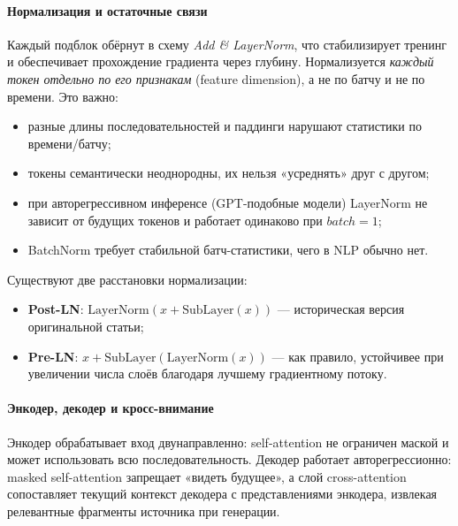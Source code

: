 \documentclass[12pt,a4paper]{article}
\begin{document}
\paragraph{Нормализация и остаточные связи}
Каждый подблок обёрнут в схему \textit{Add \& LayerNorm}, что стабилизирует тренинг и обеспечивает прохождение градиента через глубину. Нормализуется \emph{каждый токен отдельно по его признакам} (feature dimension), а не по батчу и не по времени. Это важно:
\begin{itemize}
  \item разные длины последовательностей и паддинги нарушают статистики по времени/батчу;
  \item токены семантически неоднородны, их нельзя «усреднять» друг с другом;
  \item при авторегрессивном инференсе (GPT-подобные модели) LayerNorm не зависит от будущих токенов и работает одинаково при $batch{=}1$;
  \item BatchNorm требует стабильной батч-статистики, чего в NLP обычно нет.
\end{itemize}
Существуют две расстановки нормализации:
\begin{itemize}
  \item \textbf{Post-LN}: $\mathrm{LayerNorm}(x+\mathrm{SubLayer}(x))$ — историческая версия оригинальной статьи;
  \item \textbf{Pre-LN}: $x+\mathrm{SubLayer}(\mathrm{LayerNorm}(x))$ — как правило, устойчивее при увеличении числа слоёв благодаря лучшему градиентному потоку.
\end{itemize}

\paragraph{Энкодер, декодер и кросс-внимание}
Энкодер обрабатывает вход двунаправленно: self-attention не ограничен маской и может использовать всю последовательность. Декодер работает авторегрессионно: masked self-attention запрещает «видеть будущее», а слой cross-attention сопоставляет текущий контекст декодера с представлениями энкодера, извлекая релевантные фрагменты источника при генерации.
\end{document}
